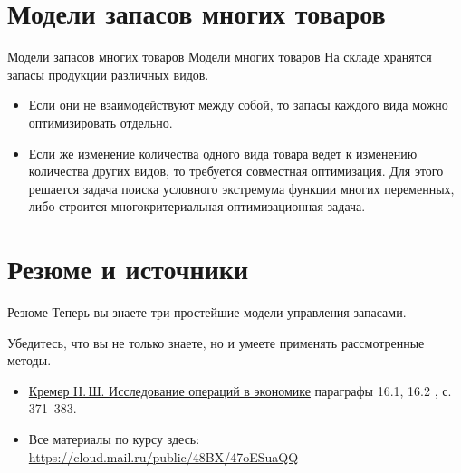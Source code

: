 \documentclass[unicode,11pt,notheorems,xcolor=table]{beamer}
\begin{document}
\section{Модели запасов многих товаров}
\begin{frame}{Модели запасов многих товаров}
Модели многих товаров На складе хранятся запасы продукции различных видов. 
\begin{itemize}
    \item Если они не взаимодействуют между собой, то запасы каждого
    вида можно оптимизировать отдельно.
    \item Если же изменение количества одного вида товара ведет к изменению количества других видов, то требуется совместная оптимизация. 
    Для этого решается задача поиска условного экстремума функции многих переменных, либо строится многокритериальная оптимизационная задача.
    
\end{itemize}
\end{frame}
\section{Резюме и источники}

 \begin{frame}{Резюме}
	Теперь вы знаете три простейшие модели управления запасами.
    
    Убедитесь, что вы не только знаете, но и умеете применять рассмотренные методы.
    

\begin{itemize}
    \item 
    {\color{blue}\href{https://cloud.mail.ru/public/4SN3/2MJYgEz95}{Кремер  Н.\,Ш. Исследование операций в экономике}} параграфы 16.1, 16.2  , с. 371--383.


\item 
	Все материалы по курсу здесь:
{\color{blue}\url{https://cloud.mail.ru/public/48BX/47oESuaQQ}}
\end{itemize}

 \end{frame}
\end{document}
